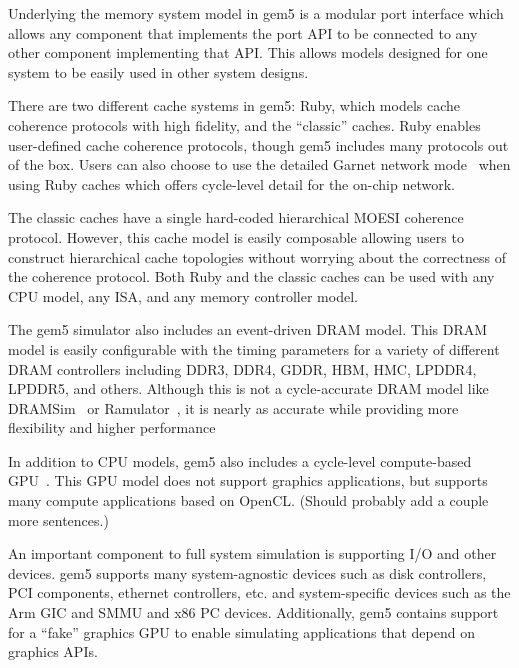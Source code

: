 Underlying the memory system model in gem5 is a modular port interface which allows any component that implements the port API to be connected to any other component implementing that API.
This allows models designed for one system to be easily used in other system designs.

There are two different cache systems in gem5: Ruby, which models cache coherence protocols with high fidelity, and the ``classic'' caches.
Ruby enables user-defined cache coherence protocols, though gem5 includes many protocols out of the box.
Users can also choose to use the detailed Garnet network mode~\cite{garnet-2} when using Ruby caches which offers cycle-level detail for the on-chip network.

The classic caches have a single hard-coded hierarchical MOESI coherence protocol.
However, this cache model is easily composable allowing users to construct hierarchical cache topologies without worrying about the correctness of the coherence protocol.
Both Ruby and the classic caches can be used with any CPU model, any ISA, and any memory controller model.

The gem5 simulator also includes an event-driven DRAM model.
This DRAM model is easily configurable with the timing parameters for a variety of different DRAM controllers including DDR3, DDR4, GDDR, HBM, HMC, LPDDR4, LPDDR5, and others.
Although this is not a cycle-accurate DRAM model like DRAMSim~\cite{} or Ramulator~\cite{}, it is nearly as accurate while providing more flexibility and higher performance~\cite{hansson-ispass-paper}

In addition to CPU models, gem5 also includes a cycle-level compute-based GPU~\cite{}.
This GPU model does not support graphics applications, but supports many compute applications based on OpenCL.
(Should probably add a couple more sentences.)

An important component to full system simulation is supporting I/O and other devices.
gem5 supports many system-agnostic devices such as disk controllers, PCI components, ethernet controllers, etc. and system-specific devices such as the Arm GIC and SMMU and x86 PC devices.
Additionally, gem5 contains support for a ``fake'' graphics GPU to enable simulating applications that depend on graphics APIs.

